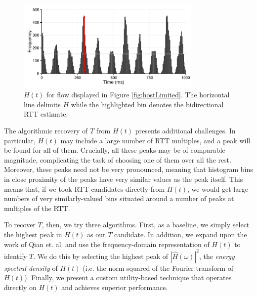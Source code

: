 \begin{figure}
  \centering
  \includegraphics[width=0.8\textwidth]{figures/malawi/rttbin.pdf}
  \caption{$H(t)$ for flow displayed in Figure \ref{fig:hostLimited}. The horizontal line delimits $\overline{H}$ while the highlighted bin denotes the bidirectional RTT estimate.\label{fig:histogram}}
\end{figure}


%
%
The algorithmic recovery of $T$ from $H(t)$ presents additional challenges. In particular, $H(t)$ may include a large number of RTT multiples, and a peak will be found for all of them. Crucially, all these peaks may be of comparable magnitude, complicating the task of choosing one of them over all the rest. Moreover, these peaks need not be very pronounced, meaning that histogram bins in close proximity of the peaks have very similar values as the peak itself. This means that, if we took RTT candidates directly from $H(t)$, we would get large numbers of very similarly-valued bins situated around a number of peaks at multiples of the RTT. 

To recover $T$, then, we try three algorithms. First, as a baseline, we simply select the highest peak in $H(t)$ as our $T$ candidate. In addition, we expand upon the work of Qian et. al. \cite{Qian:2009p429} and use the frequency-domain representation of $H(t)$ to identify $T$. We do this by selecting the highest peak of $|\hat{H}(\omega)|^2$, the \emph{energy spectral density} of $H(t)$ (i.e. the norm squared of the Fourier transform of $H(t)$). Finally, we present a custom utility-based technique that operates directly on $H(t)$ and achieves superior performance.

